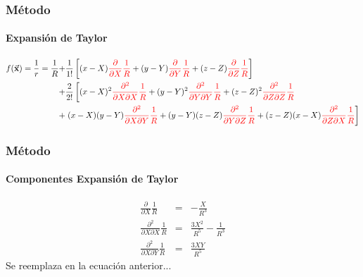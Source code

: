 \begin{frame}
    \frametitle{Método}
    \framesubtitle{Expansión de Taylor}
    \tiny
    \begin{equation}
    \begin{split}
    f(\vec{\mathbf{x}}) = \frac{1}{r} = \frac{1}{R} +& \frac{1}{1!} \left[ (x-X)\textcolor{red}{\frac{\partial}{\partial X} \frac{1}{R}} + (y-Y)\textcolor{red}{\frac{\partial}{\partial Y} \frac{1}{R}} +(z-Z)\textcolor{red}{\frac{\partial}{\partial Z} \frac{1}{R}} \right] \\
                                     +& \frac{2}{2!} \left[ (x-X)^{2}\textcolor{red}{\frac{\partial^{2}}{\partial X \partial X} \frac{1}{R}} + (y-Y)^{2}\textcolor{red}{\frac{\partial^{2}}{\partial Y\partial Y} \frac{1}{R}} +(z-Z)^{2}\textcolor{red}{\frac{\partial^{2}}{\partial Z\partial Z} \frac{1}{R}} \right. \nonumber \\
                                     +& \left.(x-X)(y-Y) \textcolor{red}{\frac{\partial^{2}}{\partial X \partial Y} \frac{1}{R}} + (y-Y)(z-Z)\textcolor{red}{\frac{\partial^{2}}{\partial Y\partial Z} \frac{1}{R}} + (z-Z)(x-X)\textcolor{red}{\frac{\partial^{2}}{\partial Z \partial X} \frac{1}{R}} \right]
    \end{split}
    \end{equation}
\end{frame}


\begin{frame}
    \frametitle{Método}
    \framesubtitle{Componentes Expansión de Taylor}

    \footnotesize
    \begin{eqnarray}
        \frac{\partial}{\partial X} \frac{1}{R} &=& -\frac{X}{R^{3}}\nonumber \\
        \frac{\partial^{2}}{\partial X\partial X} \frac{1}{R} &=& \frac{3X^{2}}{R^{5}} - \frac{1}{R^{3}} \nonumber\\
        \frac{\partial^{2}}{\partial X\partial Y} \frac{1}{R} &=& \frac{3XY}{R^{5}} \nonumber
    \end{eqnarray}
    \normalsize
    Se reemplaza en la ecuación anterior...
    

\end{frame}


